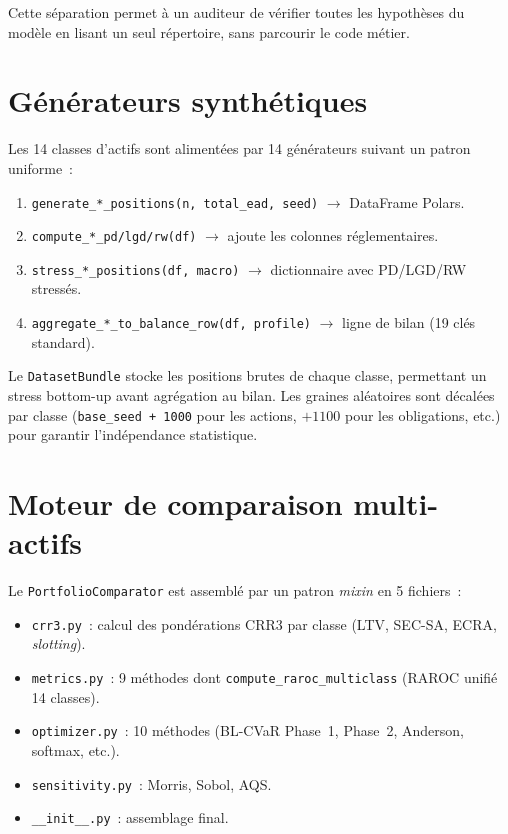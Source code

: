 \documentclass[12pt, a4paper, twoside, openright]{report}
\theoremstyle{definition}
\begin{document}
Cette séparation permet à un auditeur de vérifier toutes les hypothèses du modèle en lisant un seul répertoire, sans parcourir le code métier.

\section{Générateurs synthétiques}
\label{sec:archi-generators}

Les 14 classes d'actifs sont alimentées par 14 générateurs suivant un patron uniforme~:

\begin{enumerate}
\item \texttt{generate\_*\_positions(n, total\_ead, seed)} $\to$ DataFrame Polars.
\item \texttt{compute\_*\_pd/lgd/rw(df)} $\to$ ajoute les colonnes réglementaires.
\item \texttt{stress\_*\_positions(df, macro)} $\to$ dictionnaire avec PD/LGD/RW stressés.
\item \texttt{aggregate\_*\_to\_balance\_row(df, profile)} $\to$ ligne de bilan (19 clés standard).
\end{enumerate}

Le \texttt{DatasetBundle} stocke les positions brutes de chaque classe, permettant un stress bottom-up avant agrégation au bilan. Les graines aléatoires sont décalées par classe (\texttt{base\_seed + 1000} pour les actions, $+1100$ pour les obligations, etc.) pour garantir l'indépendance statistique.

\section{Moteur de comparaison multi-actifs}
\label{sec:archi-comparator}

Le \texttt{PortfolioComparator} est assemblé par un patron \textit{mixin} en 5 fichiers~:

\begin{itemize}
\item \texttt{crr3.py}~: calcul des pondérations CRR3 par classe (LTV, SEC-SA, ECRA, \textit{slotting}).
\item \texttt{metrics.py}~: 9 méthodes dont \texttt{compute\_raroc\_multiclass} (RAROC unifié 14 classes).
\item \texttt{optimizer.py}~: 10 méthodes (BL-CVaR Phase~1, Phase~2, Anderson, softmax, etc.).
\item \texttt{sensitivity.py}~: Morris, Sobol, AQS.
\item \texttt{\_\_init\_\_.py}~: assemblage final.
\end{itemize}
\end{document}
